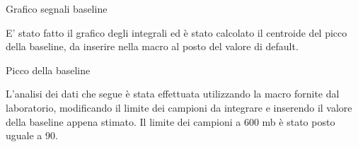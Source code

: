 \begin{grafico}
 \centering
 \caption{Grafico segnali baseline} 
 \label{gr:misura600fondo} 
\end{grafico}

E' stato fatto il grafico degli integrali ed è stato calcolato il centroide del picco della baseline, da inserire nella macro al posto del valore di default.

\begin{grafico}
 \centering
 \caption{Picco della baseline} 
 \label{gr:misura600fondo_baseline} 
\end{grafico}

L'analisi dei dati che segue è stata effettuata utilizzando la macro fornite dal laboratorio,
modificando il limite dei campioni da integrare e inserendo il valore della baseline appena stimato.
Il limite dei campioni a 600 mb è stato posto uguale a 90.

